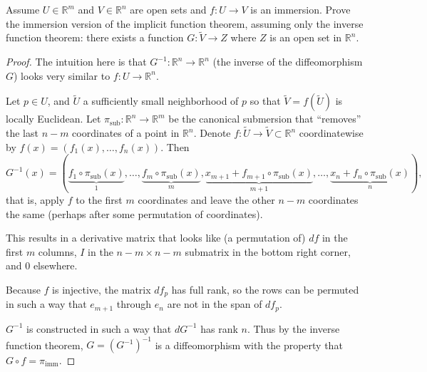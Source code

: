 \documentclass{article}
\newenvironment{problem}[2][Problem]{\begin{trivlist}
\item[\hskip \labelsep {\bfseries #1}\hskip \labelsep {\bfseries #2.}]}{\end{trivlist}}
\begin{document}
\pagebreak

\begin{problem}{2}
  Assume $U \in \mathbb{R}^m$ and $V \in \mathbb{R}^n$ are open sets and
  $f\colon U \rightarrow V$ is an immersion.
  Prove the immersion version of the implicit function theorem, assuming only
  the inverse function theorem: there exists a function $G\colon \tilde{V} \rightarrow Z$
  where $Z$ is an open set in $\mathbb{R}^n$.
\end{problem}

\begin{proof}
  The intuition here is that $G^{-1}:\mathbb{R}^n\rightarrow\mathbb{R}^n$
  (the inverse of the diffeomorphism $G$) looks
  very similar to $f:U\rightarrow\mathbb{R}^n$.

  Let $p\in U$, and $\tilde{U}$ a sufficiently small neighborhood of $p$ so that
  $\tilde{V} = f(\tilde{U})$ is locally Euclidean. Let $\pi_\text{sub}:\mathbb{R}^n \rightarrow \mathbb{R}^m$ be the canonical
  submersion that ``removes'' the last $n-m$ coordinates of a point in
  $\mathbb{R}^n$.
  Denote $f\colon \tilde{U}\rightarrow\tilde{V} \subset \mathbb{R}^n$
  coordinatewise by $f(x) = (f_1(x),\hdots,f_n(x))$.
  Then \[
    G^{-1}(x) = (
      \underbrace{f_1 \circ \pi_\text{sub}(x)}_{1},\hdots,
      \underbrace{f_m \circ \pi_\text{sub}(x)}_{m},
      \underbrace{x_{m+1} + f_{m+1} \circ \pi_\text{sub}(x)}_{m+1},\hdots,
      \underbrace{x_n + f_n \circ \pi_\text{sub}(x)}_n),
  \] that is, apply $f$ to the first $m$ coordinates and leave the other $n-m$
  coordinates the same (perhaps after some permutation of coordinates).

  This results in a derivative matrix that looks like (a permutation of) $df$ in
  the first $m$ columns, $I$ in the $n-m \times n-m$ submatrix in the bottom
  right corner, and $0$ elsewhere.

  Because $f$ is injective, the matrix $df_p$ has full rank, so the rows can be
  permuted in such a way that $e_{m+1}$ through $e_n$ are not in the span of
  $df_p$.

  $G^{-1}$ is constructed in such a way that $dG^{-1}$ has rank $n$. Thus by the
  inverse function theorem, $G = (G^{-1})^{-1}$ is a diffeomorphism with the
  property that $G \circ f = \pi_\text{imm}$.
\end{proof}
\end{document}
